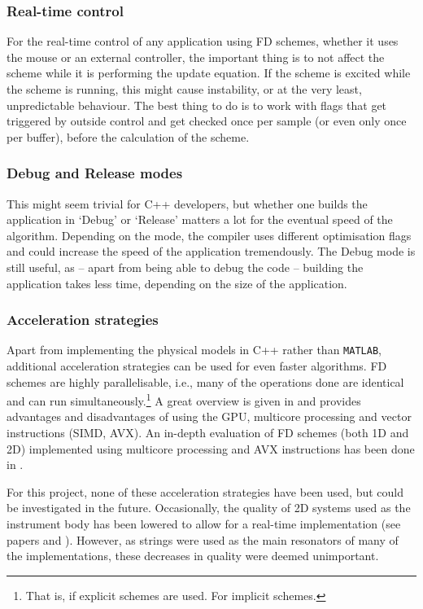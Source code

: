 \subsubsection{Real-time control}
For the real-time control of any application using FD schemes, whether it uses the mouse or an external controller, the important thing is to not affect the scheme while it is performing the update equation. If the scheme is excited while the scheme is running, this might cause instability, or at the very least, unpredictable behaviour. The best thing to do is to work with flags that get triggered by outside control and get checked once per sample (or even only once per buffer), before the calculation of the scheme.

\subsubsection{Debug and Release modes}
This might seem trivial for C++ developers, but whether one builds the application in `Debug' or `Release' matters a lot for the eventual speed of the algorithm. Depending on the mode, the compiler uses different optimisation flags and could increase the speed of the application tremendously. The Debug mode is still useful, as -- apart from being able to debug the code -- building the application takes less time, depending on the size of the application.

\subsubsection{Acceleration strategies}
Apart from implementing the physical models in C++ rather than \texttt{MATLAB}, additional acceleration strategies can be used for even faster algorithms. FD schemes are highly parallelisable, i.e., many of the operations done are identical and can run simultaneously.\footnote{That is, if explicit schemes are used. For implicit schemes.} A great overview is given in \cite{Bilbao2019CMJb} and provides advantages and disadvantages of using the GPU, multicore processing and vector instructions (SIMD, AVX). An in-depth evaluation of FD schemes (both 1D and 2D) implemented using multicore processing and AVX instructions has been done in \cite{Webb2015}.

For this project, none of these acceleration strategies have been used, but could be investigated in the future. Occasionally, the quality of 2D systems used as the instrument body has been lowered to allow for a real-time implementation (see papers \citeP[A] and \citeP[D]). However, as strings were used as the main resonators of many of the implementations, these decreases in quality were deemed unimportant.

